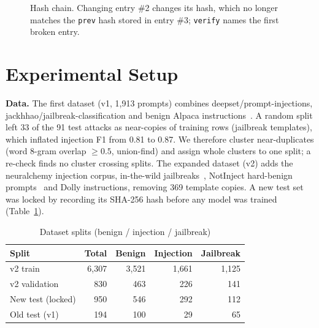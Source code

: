 \documentclass[conference]{IEEEtran}
\begin{document}
\begin{figure}[t]
\centering
{}
\caption{Hash chain. Changing entry \#2 changes its hash, which no longer
matches the \texttt{prev} hash stored in entry \#3; \texttt{verify} names the
first broken entry.}
\label{fig:chain}
\end{figure}

\section{Experimental Setup}

\textbf{Data.} The first dataset (v1, 1{,}913 prompts) combines
deepset/prompt-injections, jackhhao/jailbreak-classification and benign
Alpaca instructions~\cite{taori2023alpaca}. A random split left 33 of the
91 test attacks as near-copies of training rows (jailbreak templates),
which inflated injection F1 from 0.81 to 0.87. We therefore cluster
near-duplicates (word 8-gram overlap $\ge0.5$, union-find) and assign whole
clusters to one split; a re-check finds no cluster crossing splits. The
expanded dataset (v2) adds the neuralchemy injection corpus, in-the-wild
jailbreaks~\cite{shen2024dan}, NotInject hard-benign
prompts~\cite{li2024injecguard} and Dolly instructions, removing 369
template copies. A new test set was locked by recording its SHA-256 hash
before any model was trained (Table~\ref{tab:data}).

\begin{table}[t]
\caption{Dataset splits (benign / injection / jailbreak)}
\label{tab:data}
\centering
\footnotesize
\begin{tabular}{lrrrr}
\toprule
Split & Total & Benign & Injection & Jailbreak \\
\midrule
v2 train & 6{,}307 & 3{,}521 & 1{,}661 & 1{,}125 \\
v2 validation & 830 & 463 & 226 & 141 \\
New test (locked) & 950 & 546 & 292 & 112 \\
Old test (v1) & 194 & 100 & 29 & 65 \\
\bottomrule
\end{tabular}
\end{table}
\end{document}
